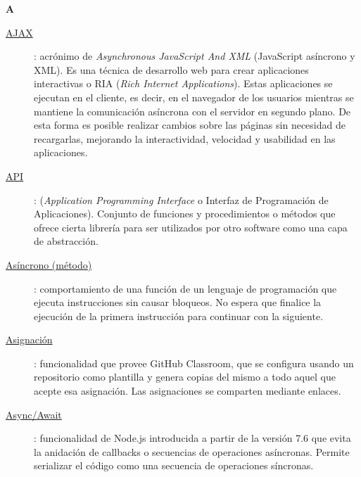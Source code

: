 {\bfseries {\Huge A}}\label{Apendice1:A}
\bigskip
\bigskip

\begin{description}
  \item[\underline{AJAX}\label{apend1:ajax}]: acrónimo de \textit{Asynchronous JavaScript And XML} (JavaScript asíncrono y XML). Es una técnica de desarrollo web para crear aplicaciones interactivas o RIA (\textit{Rich Internet Applications}). Estas aplicaciones se ejecutan en el cliente, es decir, en el navegador de los usuarios mientras se 
  mantiene la comunicación asíncrona con el servidor en segundo plano. De esta forma es posible realizar cambios sobre las páginas sin necesidad de recargarlas, mejorando la interactividad, velocidad y usabilidad en las aplicaciones.
  \bigskip
\end{description}

\begin{description}
  \item[\underline{API}\label{apend1:api}]: (\textit{Application Programming Interface} o Interfaz de Programación de Aplicaciones). Conjunto de funciones y procedimientos o métodos que ofrece cierta librería para ser utilizados por otro software como una capa de abstracción. 
  \bigskip
\end{description}

\begin{description}
  \item[\underline{Asíncrono (método)}\label{apend1:asincrono}]: comportamiento de una función de un lenguaje de programación que ejecuta instrucciones sin causar bloqueos. No espera que finalice la ejecución de la primera instrucción para continuar con la siguiente.
  \bigskip
\end{description}

\begin{description}
  \item[\underline{Asignación}\label{apend1:asignacion}]: funcionalidad que provee GitHub Classroom, que se configura usando un repositorio como plantilla y genera copias del mismo a todo aquel que acepte esa asignación. Las asignaciones se comparten mediante enlaces.
  \bigskip
\end{description}

\begin{description}
  \item[\underline{Async/Await}\label{apend1:async-await}]: funcionalidad de Node.js introducida a partir de la versión 7.6 que evita la anidación de callbacks o secuencias de operaciones asíncronas. Permite serializar el código como una secuencia de operaciones síncronas.
  \bigskip
\end{description}


